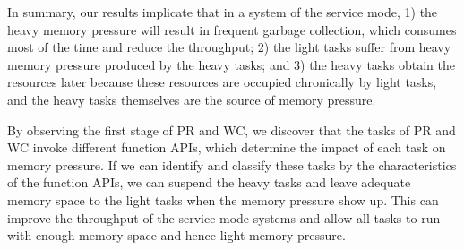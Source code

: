 In summary, our results implicate that in a system of the service mode, 1) the heavy memory pressure will result in frequent garbage collection, which consumes most of the time and reduce the throughput; 2) the light tasks suffer from heavy memory pressure produced by the heavy tasks; and 3) the heavy tasks obtain the resources later because these resources are occupied chronically by light tasks, and the heavy tasks themselves are the source of memory pressure.

By observing the first stage of PR and WC, we discover that the tasks of PR and WC invoke different function APIs, which determine the impact of each task on memory pressure. If we can identify and classify these tasks by the characteristics of the function APIs, we can suspend the heavy tasks and leave adequate memory space to the light tasks when the memory pressure show up. This can improve the throughput of the service-mode systems and allow all tasks to run with enough memory space and hence light memory pressure.



